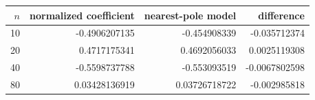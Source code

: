 \begin{tabular}{rrrr}
\toprule
$n$ & normalized coefficient & nearest-pole model & difference \\
\midrule
10 & -0.4906207135 & -0.454908339 & -0.035712374 \\
20 & 0.4717175341 & 0.4692056033 & 0.0025119308 \\
40 & -0.5598737788 & -0.553093519 & -0.0067802598 \\
80 & 0.03428136919 & 0.03726718722 & -0.002985818 \\
\bottomrule
\end{tabular}
